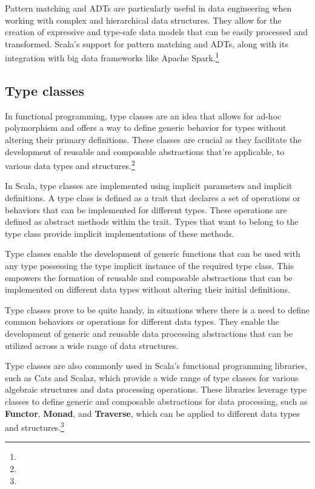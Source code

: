 

Pattern matching and ADTs are particularly useful in data engineering when working with complex and hierarchical data structures. They allow for the creation of expressive and type-safe data models that can be easily processed and transformed. Scala's support for pattern matching and ADTs, along with its integration with big data frameworks like Apache Spark.\footnote[14]{}



\subsection{Type classes}

In functional programming, type classes are an idea that allows for ad-hoc polymorphism and offers a way to define generic behavior for types without altering their primary definitions. These classes are crucial as they facilitate the development of reusable and composable abstractions that're applicable, to various data types and structures.\footnote[1]{}

In Scala, type classes are implemented using implicit parameters and implicit definitions. A type class is defined as a trait that declares a set of operations or behaviors that can be implemented for different types. These operations are defined as abstract methods within the trait. Types that want to belong to the type class provide implicit implementations of these methods.\footnotemark[1]



Type classes enable the development of generic functions that can be used with any type possessing the type implicit instance of the required type class. This empowers the formation of reusable and composable abstractions that can be implemented on different data types without altering their initial definitions.\footnotemark[1]



Type classes prove to be quite handy, in situations where there is a need to define common behaviors or operations for different data types. They enable the development of generic and reusable data processing abstractions that can be utilized across a wide range of data structures.\footnotemark[1]



Type classes are also commonly used in Scala's functional programming libraries, such as Cats and Scalaz, which provide a wide range of type classes for various algebraic structures and data processing operations. These libraries leverage type classes to define generic and composable abstractions for data processing, such as \textbf{Functor}, \textbf{Monad}, and \textbf{Traverse}, which can be applied to different data types and structures.\footnote[1]{}

